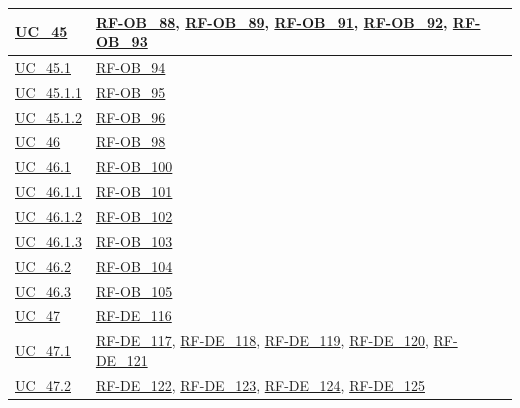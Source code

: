 \begin{longtable}{|
        >{\raggedright\arraybackslash}p{} |
        >{\raggedright\arraybackslash}p{} |
    }
    \hyperref[uc_45]{UC\_45} & \hyperlink{rf-ob_88}{RF-OB\_88}, \hyperlink{rf-ob_89}{RF-OB\_89}, \hyperlink{rf-ob_91}{RF-OB\_91}, \hyperlink{rf-ob_92}{RF-OB\_92}, \hyperlink{rf-ob_93}{RF-OB\_93} \\
    \hline
    \hyperref[uc_45.1]{UC\_45.1} & \hyperlink{rf-ob_94}{RF-OB\_94} \\
    \hline
    \hyperref[uc_45.1.1]{UC\_45.1.1} & \hyperlink{rf-ob_95}{RF-OB\_95}\\
    \hline
    \hyperref[uc_45.1.2]{UC\_45.1.2} & \hyperlink{rf-ob_96}{RF-OB\_96}\\
    \hline

    \hyperref[uc_46]{UC\_46} & \hyperlink{rf-ob_98}{RF-OB\_98} \\
    \hline
    \hyperref[uc_46.1]{UC\_46.1} & \hyperlink{rf-ob_100}{RF-OB\_100} \\
    \hline
    \hyperref[uc_46.1.1]{UC\_46.1.1} & \hyperlink{rf-ob_101}{RF-OB\_101} \\ 
    \hline
    \hyperref[uc_46.1.2]{UC\_46.1.2} & \hyperlink{rf-ob_102}{RF-OB\_102}\\
    \hline
    \hyperref[uc_46.1.3]{UC\_46.1.3} & \hyperlink{rf-ob_103}{RF-OB\_103}\\
    \hline
    \hyperref[uc_46.2]{UC\_46.2} & \hyperlink{rf-ob_104}{RF-OB\_104} \\
    \hline
    \hyperref[uc_46.3]{UC\_46.3} & \hyperlink{rf-ob_105}{RF-OB\_105} \\
    \hline

    \hyperref[uc_47]{UC\_47} & \hyperlink{rf-de_116}{RF-DE\_116} \\
    \hline
    \hyperref[uc_47.1]{UC\_47.1} & \hyperlink{rf-de_117}{RF-DE\_117}, \hyperlink{rf-de_118}{RF-DE\_118}, \hyperlink{rf-de_119}{RF-DE\_119}, \hyperlink{rf-de_120}{RF-DE\_120}, \hyperlink{rf-de_121}{RF-DE\_121} \\
    \hline
    \hyperref[uc_47.2]{UC\_47.2} & \hyperlink{rf-de_122}{RF-DE\_122}, \hyperlink{rf-de_123}{RF-DE\_123}, \hyperlink{rf-de_124}{RF-DE\_124}, \hyperlink{rf-de_125}{RF-DE\_125} \\
    \hline


\end{longtable}
